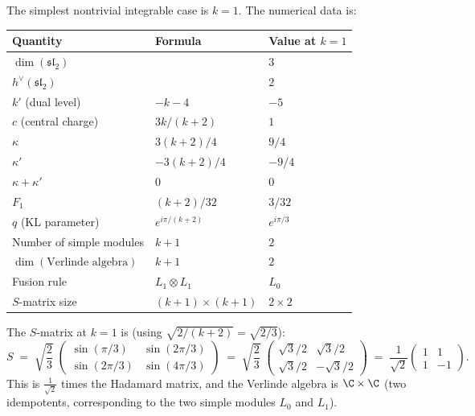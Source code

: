 The simplest nontrivial integrable case is $k = 1$. The numerical
data is:
\begin{center}
\renewcommand{\arraystretch}{1.3}
\small
\begin{tabular}{lll}
\textbf{Quantity} & \textbf{Formula} & \textbf{Value at $k = 1$} \\
\hline
$\dim(\mathfrak{sl}_2)$ & & $3$ \\
$h^\vee(\mathfrak{sl}_2)$ & & $2$ \\
$k'$ (dual level) & $-k - 4$ & $-5$ \\
$c$ (central charge) & $3k/(k+2)$ & $1$ \\
$\kappa$ & $3(k+2)/4$ & $9/4$ \\
$\kappa'$ & $-3(k+2)/4$ & $-9/4$ \\
$\kappa + \kappa'$ & $0$ & $0$ \\
$F_1$ & $(k+2)/32$ & $3/32$ \\
$q$ (KL parameter) & $e^{i\pi/(k+2)}$ & $e^{i\pi/3}$ \\
Number of simple modules & $k + 1$ & $2$ \\
$\dim(\text{Verlinde algebra})$ & $k + 1$ & $2$ \\
Fusion rule & $L_1 \otimes L_1$ & $L_0$ \\
$S$-matrix size & $(k{+}1) \times (k{+}1)$ & $2 \times 2$ \\
\end{tabular}
\end{center}

The $S$-matrix at $k = 1$ is (using $\sqrt{2/(k+2)} = \sqrt{2/3}$):
\begin{equation}\label{eq:benchmark-s-matrix-k1}
 S
 \;=\;
 \sqrt{\frac{2}{3}}\;
 \begin{pmatrix}
 \sin(\pi/3) & \sin(2\pi/3) \\
 \sin(2\pi/3) & \sin(4\pi/3)
 \end{pmatrix}
 \;=\;
 \sqrt{\frac{2}{3}}\;
 \begin{pmatrix}
 \sqrt{3}/2 & \sqrt{3}/2 \\
 \sqrt{3}/2 & -\sqrt{3}/2
 \end{pmatrix}
 \;=\;
 \frac{1}{\sqrt{2}}
 \begin{pmatrix}
 1 & 1 \\
 1 & -1
 \end{pmatrix}.
\end{equation}
This is $\frac{1}{\sqrt{2}}$ times the Hadamard matrix, and
the Verlinde algebra is
$\C \times \C$ (two idempotents, corresponding to the two simple
modules $L_0$ and $L_1$).

